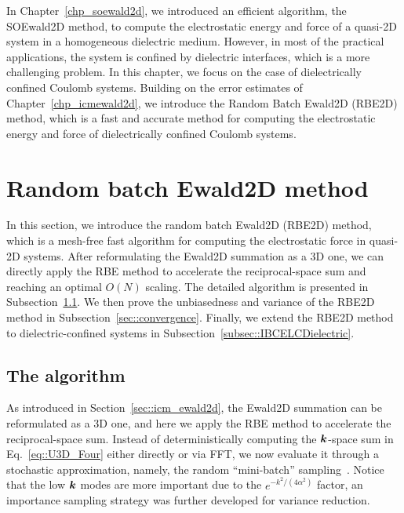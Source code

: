 In Chapter~\ref{chp_soewald2d}, we introduced an efficient algorithm, the SOEwald2D method, to compute the electrostatic energy and force of a quasi-2D system in a homogeneous dielectric medium.
However, in most of the practical applications, the system is confined by dielectric interfaces, which is a more challenging problem.
In this chapter, we focus on the case of dielectrically confined Coulomb systems.
Building on the error estimates of Chapter~\ref{chp_icmewald2d}, we introduce the Random Batch Ewald2D (RBE2D) method, which is a fast and accurate method for computing the electrostatic energy and force of dielectrically confined Coulomb systems.

\section{Random batch Ewald2D method}\label{sec::RBE2D}

In this section, we introduce the random batch Ewald2D (RBE2D) method, which is a mesh-free fast algorithm for computing the electrostatic force in quasi-2D systems.
After reformulating the Ewald2D summation as a 3D one, we can directly apply the RBE method to accelerate the reciprocal-space sum and reaching an optimal $O(N)$ scaling.
The detailed algorithm is presented in Subsection~\ref{subsec::RBE2D_algorithm}.
We then prove the unbiasedness and variance of the RBE2D method in Subsection~\ref{sec::convergence}.
Finally, we extend the RBE2D method to dielectric-confined systems in Subsection~\ref{subsec::IBCELCDielectric}.

\subsection{The algorithm}\label{subsec::RBE2D_algorithm}

As introduced in Section~\ref{sec::icm_ewald2d}, the Ewald2D summation can be reformulated as a 3D one, and here we apply the RBE method to accelerate the reciprocal-space sum.
Instead of deterministically computing the $\boldsymbol{k}$-space sum in Eq.~\eqref{eq::U3D_Four} either directly or via FFT, we now evaluate it through a stochastic approximation, namely, the random ``mini-batch'' sampling~\cite{jin2020random}. 
Notice that the low $\boldsymbol{k}$ modes are more important due to the $e^{-k^2/(4\alpha^2)}$ factor, an importance sampling strategy was further developed for variance reduction.

